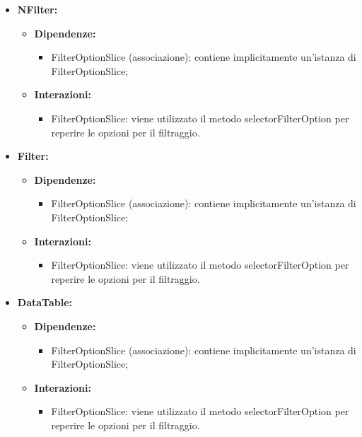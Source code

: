 \begin{itemize}
    \item \textbf{NFilter:}
    \begin{itemize}
        \item \textbf{Dipendenze:}
        \begin{itemize}
            \item FilterOptionSlice (associazione): contiene implicitamente un'istanza di FilterOptionSlice;
        \end{itemize} 
        \item \textbf{Interazioni:}
        \begin{itemize}
            \item FilterOptionSlice: viene utilizzato il metodo selectorFilterOption per reperire le opzioni per il filtraggio.
        \end{itemize} 
    \end{itemize}

    \item \textbf{Filter:}
    \begin{itemize}
        \item \textbf{Dipendenze:}
        \begin{itemize}
            \item FilterOptionSlice (associazione): contiene implicitamente un'istanza di FilterOptionSlice;
        \end{itemize} 
        \item \textbf{Interazioni:}
        \begin{itemize}
            \item FilterOptionSlice: viene utilizzato il metodo selectorFilterOption per reperire le opzioni per il filtraggio.
        \end{itemize} 
    \end{itemize}

    \item \textbf{DataTable:}
    \begin{itemize}
        \item \textbf{Dipendenze:}
        \begin{itemize}
            \item FilterOptionSlice (associazione): contiene implicitamente un'istanza di FilterOptionSlice;
        \end{itemize} 
        \item \textbf{Interazioni:}
        \begin{itemize}
            \item FilterOptionSlice: viene utilizzato il metodo selectorFilterOption per reperire le opzioni per il filtraggio.
        \end{itemize} 
    \end{itemize}


\end{itemize}
